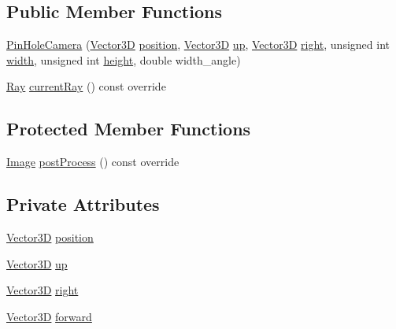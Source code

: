 \subsection*{Public Member Functions}
\begin{DoxyCompactItemize}
\item 
\hyperlink{classPinHoleCamera_a367c84edf7d49c7ed4e27fc94b44521e}{Pin\+Hole\+Camera} (\hyperlink{classVector3D}{Vector3D} \hyperlink{classPinHoleCamera_ad70cef45e6269877a9fe6b6724fcdb2f}{position}, \hyperlink{classVector3D}{Vector3D} \hyperlink{classPinHoleCamera_a25b1d519b4b7e74942f120aac1f067a9}{up}, \hyperlink{classVector3D}{Vector3D} \hyperlink{classPinHoleCamera_a0e235a4cb8cc58ecfa7a2483ea11398e}{right}, unsigned int \hyperlink{classCamera_aa18f0bf8b6e8cb661643d980a4484ac0}{width}, unsigned int \hyperlink{classCamera_ae9ed166dbbc8876027ecbec9af8761c4}{height}, double width\+\_\+angle)
\item 
\hyperlink{classRay}{Ray} \hyperlink{classPinHoleCamera_ac379cbcc7d75e5d651beb1bd043e39a4}{current\+Ray} () const override
\end{DoxyCompactItemize}
\subsection*{Protected Member Functions}
\begin{DoxyCompactItemize}
\item 
\hyperlink{Background_8h_a10624870db6b3fba52ad9c5d430308e1}{Image} \hyperlink{classPinHoleCamera_a654639989b4afdd364eb506f0b0597cb}{post\+Process} () const override
\end{DoxyCompactItemize}
\subsection*{Private Attributes}
\begin{DoxyCompactItemize}
\item 
\hyperlink{classVector3D}{Vector3D} \hyperlink{classPinHoleCamera_ad70cef45e6269877a9fe6b6724fcdb2f}{position}
\item 
\hyperlink{classVector3D}{Vector3D} \hyperlink{classPinHoleCamera_a25b1d519b4b7e74942f120aac1f067a9}{up}
\item 
\hyperlink{classVector3D}{Vector3D} \hyperlink{classPinHoleCamera_a0e235a4cb8cc58ecfa7a2483ea11398e}{right}
\item 
\hyperlink{classVector3D}{Vector3D} \hyperlink{classPinHoleCamera_a2166982d9f41154d76889ff6b9759218}{forward}
\end{DoxyCompactItemize}
